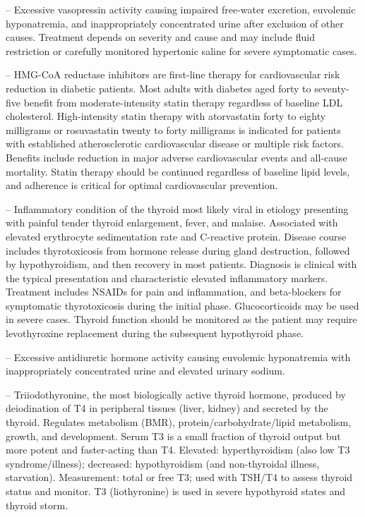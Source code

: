 -- Excessive vasopressin activity causing impaired free-water excretion, euvolemic hyponatremia, and inappropriately concentrated urine after exclusion of other causes. Treatment depends on severity and cause and may include fluid restriction or carefully monitored hypertonic saline for severe symptomatic cases.

-- HMG-CoA reductase inhibitors are first-line therapy for cardiovascular risk reduction in diabetic patients. Most adults with diabetes aged forty to seventy-five benefit from moderate-intensity statin therapy regardless of baseline LDL cholesterol. High-intensity statin therapy with atorvastatin forty to eighty milligrams or rosuvastatin twenty to forty milligrams is indicated for patients with established atherosclerotic cardiovascular disease or multiple risk factors. Benefits include reduction in major adverse cardiovascular events and all-cause mortality. Statin therapy should be continued regardless of baseline lipid levels, and adherence is critical for optimal cardiovascular prevention.

-- Inflammatory condition of the thyroid most likely viral in etiology presenting with painful tender thyroid enlargement, fever, and malaise. Associated with elevated erythrocyte sedimentation rate and C-reactive protein. Disease course includes thyrotoxicosis from hormone release during gland destruction, followed by hypothyroidism, and then recovery in most patients. Diagnosis is clinical with the typical presentation and characteristic elevated inflammatory markers. Treatment includes NSAIDs for pain and inflammation, and beta-blockers for symptomatic thyrotoxicosis during the initial phase. Glucocorticoids may be used in severe cases. Thyroid function should be monitored as the patient may require levothyroxine replacement during the subsequent hypothyroid phase.

-- Excessive antidiuretic hormone activity causing euvolemic hyponatremia with inappropriately concentrated urine and elevated urinary sodium.

-- Triiodothyronine, the most biologically active thyroid hormone, produced by deiodination of T4 in peripheral tissues (liver, kidney) and secreted by the thyroid. Regulates metabolism (BMR), protein/carbohydrate/lipid metabolism, growth, and development. Serum T3 is a small fraction of thyroid output but more potent and faster-acting than T4. Elevated: hyperthyroidism (also low T3 syndrome/illness); decreased: hypothyroidism (and non-thyroidal illness, starvation). Measurement: total or free T3; used with TSH/T4 to assess thyroid status and monitor. T3 (liothyronine) is used in severe hypothyroid states and thyroid storm.

